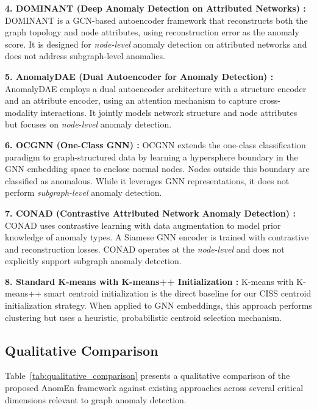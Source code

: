 \documentclass[10pt,twocolumn,a4paper]{article}
\begin{document}
\textbf{4. DOMINANT (Deep Anomaly Detection on Attributed Networks) \cite{ding2019dominant}:}
DOMINANT is a GCN-based autoencoder framework that reconstructs both the graph topology and node attributes, using reconstruction error as the anomaly score. It is designed for \textit{node-level} anomaly detection on attributed networks and does not address subgraph-level anomalies.

\textbf{5. AnomalyDAE (Dual Autoencoder for Anomaly Detection) \cite{fan2020anomalydae}:}
AnomalyDAE employs a dual autoencoder architecture with a structure encoder and an attribute encoder, using an attention mechanism to capture cross-modality interactions. It jointly models network structure and node attributes but focuses on \textit{node-level} anomaly detection.

\textbf{6. OCGNN (One-Class GNN) \cite{wang2021ocgnn}:}
OCGNN extends the one-class classification paradigm to graph-structured data by learning a hypersphere boundary in the GNN embedding space to enclose normal nodes. Nodes outside this boundary are classified as anomalous. While it leverages GNN representations, it does not perform \textit{subgraph-level} anomaly detection.

\textbf{7. CONAD (Contrastive Attributed Network Anomaly Detection) \cite{xu2022conad}:}
CONAD uses contrastive learning with data augmentation to model prior knowledge of anomaly types. A Siamese GNN encoder is trained with contrastive and reconstruction losses. CONAD operates at the \textit{node-level} and does not explicitly support subgraph anomaly detection.

\textbf{8. Standard K-means with K-means++ Initialization \cite{arthur2007kmeans}:}
K-means with K-means++ smart centroid initialization is the direct baseline for our CISS centroid initialization strategy. When applied to GNN embeddings, this approach performs clustering but uses a heuristic, probabilistic centroid selection mechanism.

\subsection{Qualitative Comparison}

Table~\ref{tab:qualitative_comparison} presents a qualitative comparison of the proposed AnomEn framework against existing approaches across several critical dimensions relevant to graph anomaly detection.
\end{document}
